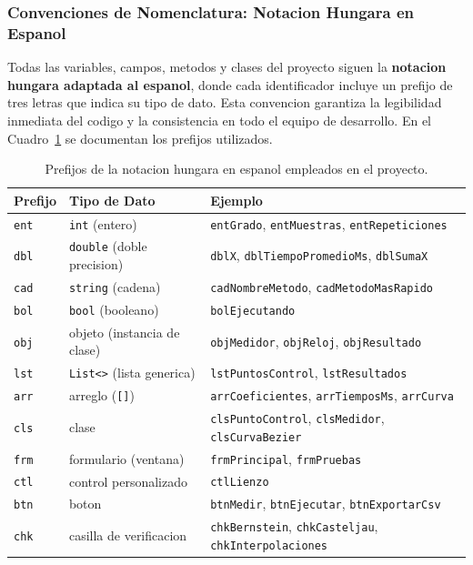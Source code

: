 \subsubsection{Convenciones de Nomenclatura: Notacion Hungara en Espanol}
\label{subsubsec:impl_notacion}

Todas las variables, campos, metodos y clases del proyecto siguen la \textbf{notacion hungara adaptada al espanol}, donde cada identificador incluye un prefijo de tres letras que indica su tipo de dato. Esta convencion garantiza la legibilidad inmediata del codigo y la consistencia en todo el equipo de desarrollo. En el Cuadro~\ref{tab:impl_notacion} se documentan los prefijos utilizados.

\begin{table}[H]
\centering
\caption{Prefijos de la notacion hungara en espanol empleados en el proyecto.}
\label{tab:impl_notacion}
\begin{tabular}{llp{7cm}}
\toprule
\textbf{Prefijo} & \textbf{Tipo de Dato} & \textbf{Ejemplo} \\
\midrule
\texttt{ent} & \texttt{int} (entero) & \texttt{entGrado}, \texttt{entMuestras}, \texttt{entRepeticiones} \\
\texttt{dbl} & \texttt{double} (doble precision) & \texttt{dblX}, \texttt{dblTiempoPromedioMs}, \texttt{dblSumaX} \\
\texttt{cad} & \texttt{string} (cadena) & \texttt{cadNombreMetodo}, \texttt{cadMetodoMasRapido} \\
\texttt{bol} & \texttt{bool} (booleano) & \texttt{bolEjecutando} \\
\texttt{obj} & objeto (instancia de clase) & \texttt{objMedidor}, \texttt{objReloj}, \texttt{objResultado} \\
\texttt{lst} & \texttt{List<>} (lista generica) & \texttt{lstPuntosControl}, \texttt{lstResultados} \\
\texttt{arr} & arreglo (\texttt{[]}) & \texttt{arrCoeficientes}, \texttt{arrTiemposMs}, \texttt{arrCurva} \\
\texttt{cls} & clase & \texttt{clsPuntoControl}, \texttt{clsMedidor}, \texttt{clsCurvaBezier} \\
\texttt{frm} & formulario (ventana) & \texttt{frmPrincipal}, \texttt{frmPruebas} \\
\texttt{ctl} & control personalizado & \texttt{ctlLienzo} \\
\texttt{btn} & boton & \texttt{btnMedir}, \texttt{btnEjecutar}, \texttt{btnExportarCsv} \\
\texttt{chk} & casilla de verificacion & \texttt{chkBernstein}, \texttt{chkCasteljau}, \texttt{chkInterpolaciones} \\

\end{tabular}
\end{table}
